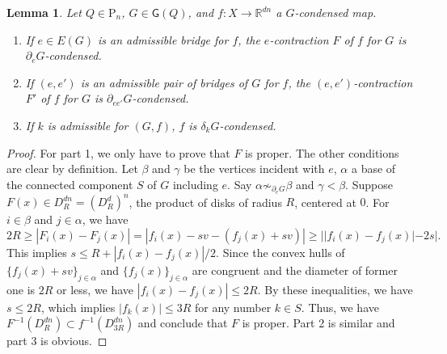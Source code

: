 \documentclass[reqno]{amsart}
\theoremstyle{definition}
\theoremstyle{plain}
\newtheorem{lem}[defi]{Lemma}
\newcommand{\GG}{\mathsf{G}}%
\newcommand{\RR}{\mathbb{R}}
\newcommand{\PP}{\mathrm{P}} %
\begin{document}
\begin{lem}\label{Lcontraction}
Let $Q\in \PP_n$, $G\in \GG(Q)$, and  $f:X\to \RR^{dn}$  a $G$-condensed map.
\begin{enumerate}
\item  If $e\in E(G)$ is an admissible bridge for $f$, the $e$-contraction $F$ of $f$ for $G$ is $\partial_eG$-condensed. 
\item  If $(e, e')$ is an admissible pair of   bridges of $G$ for $f$, the $(e,e')$-contraction $F'$ of $f$ for $G$ is $\partial_{ee'}G$-condensed.
\item  If $k$ is admissible for $(G,f)$, $f$ is $\delta_kG$-condensed.
\end{enumerate}
\end{lem}
\begin{proof}
For part 1, we only have to prove that $F$ is proper. The other conditions are clear by definition. Let $\beta$ and $\gamma$ be the vertices incident with $e$, $\alpha$  a base of the connected component $S$ of $G$ including $e$.  Say $\alpha\not\sim_{\partial_eG}\beta$ and $\gamma<\beta$. Suppose $F(x)\in D^{dn}_R=(D^d_R)^n$, the product of disks of radius $R$, centered at $0$. For $i\in \beta$ and $j\in \alpha$, we have
\[
2R\geq |F_i(x)-F_j(x)|=|f_i(x)- sv-(f_j(x)+ sv)|\geq ||f_i(x)-f_j(x)|-2s|.
\]  
This implies $s\leq R+|f_i(x)-f_j(x)|/2$. Since the convex hulls of  $\{f_j(x)+sv\}_{j\in \alpha}$ and $\{f_j(x)\}_{j\in \alpha}$ are congruent and the diameter of former one is  $2R$ or less, we have $|f_i(x)-f_j(x)|\leq 2R$. By these inequalities,  we  have $s\leq 2R$, which implies $|f_k(x)|\leq 3R$ for any number $k\in S$. Thus, we have 
$F^{-1}(D^{dn}_R)\subset f^{-1}(D^{dn}_{3R})$ and conclude that $F$ is proper.  Part 2 is similar and  part 3 is obvious. 
\end{proof}
\end{document}
